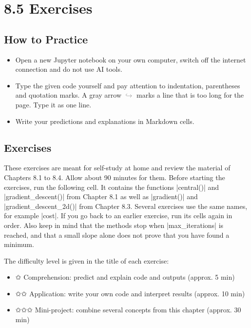 \documentclass[paper=a4, fontsize=11pt, parskip=half]{scrartcl}
\begin{document}
\section*{8.5 Exercises}

\subsection*{How to Practice}

\begin{itemize}[noitemsep]
  \item Open a new Jupyter notebook on your own computer, switch off the
        internet connection and do not use AI tools.
  \item Type the given code yourself and pay attention to indentation,
        parentheses and quotation marks. A gray arrow
        \textcolor{gray}{$\hookrightarrow$} marks a line that is too long for
        the page. Type it as one line.
  \item Write your predictions and explanations in Markdown cells.
\end{itemize}

\subsection*{Exercises}

These exercises are meant for self-study at home and review the material of Chapters 8.1 to 8.4. Allow about 90 minutes for them. Before starting the exercises, run the following cell. It contains the functions \py|central()| and \py|gradient_descent()| from Chapter 8.1 as well as \py|gradient()| and \py|gradient_descent_2d()| from Chapter 8.3. Several exercises use the same names, for example \py|cost|. If you go back to an earlier exercise, run its cells again in order. Also keep in mind that the methods stop when \py|max_iterations| is reached, and that a small slope alone does not prove that you have found a minimum.

The difficulty level is given in the title of each exercise:

\begin{itemize}
  \item ✩ Comprehension: predict and explain code and outputs (approx. 5 min)
  \item ✩✩ Application: write your own code and interpret results (approx. 10 min)
  \item ✩✩✩ Mini-project: combine several concepts from this chapter (approx. 30 min)
\end{itemize}
\end{document}

